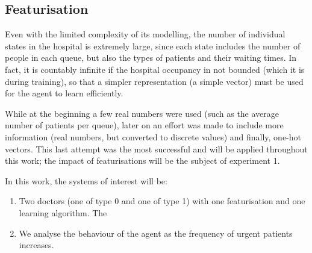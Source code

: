 \documentclass[11point]{article}
\begin{document}
\subsection{Featurisation}

Even with the limited complexity of its modelling, the number of individual states in the hospital is extremely large, since each state includes the number of people in each queue, but also the types of patients and their waiting times.
In fact, it is countably infinite if the hospital occupancy in not bounded (which it is during training), so that a simpler representation (a simple vector) must be used for the agent to learn efficiently.

While at the beginning a few real numbers were used (such as the average number of patients per queue), later on an effort was made to include more information (real numbers, but converted to discrete values) and finally, one-hot vectors.
This last attempt was the most successful and will be applied throughout this work; the impact of featurisations will be the subject of experiment 1.

In this work, the systems of interest will be:
\begin{enumerate}[\bfseries {Experiment} 1:, wide, labelwidth=!, labelindent=0pt]
    \item Two doctors (one of type 0 and one of type 1) with one featurisation and one learning algorithm. The 
    \item
    We analyse the behaviour of the agent as the frequency of urgent patients increases.
\end{enumerate}{}


\end{document}
